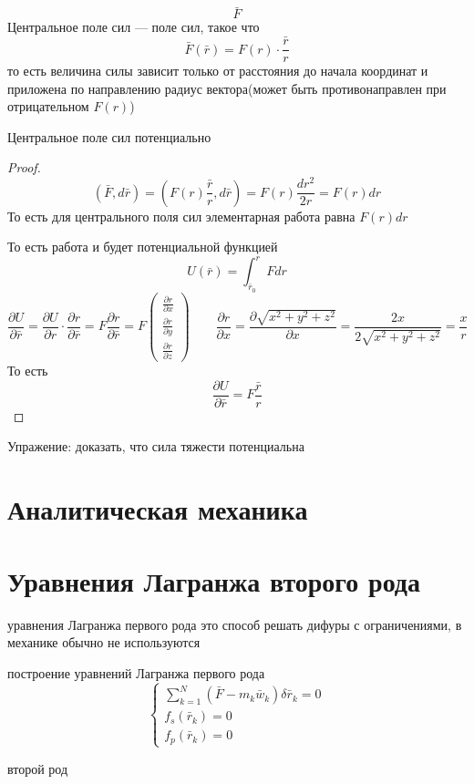 \documentclass[crop=false]{standalone}
\begin{document}
\[\bar F\]
\Def Центральное поле сил — поле сил, такое что
\[\bar F(\bar r) = F(r) \cdot \frac{\bar r}{r}\]
то есть величина силы зависит только от расстояния до начала координат и приложена по направлению радиус вектора(может быть противонаправлен при  отрицательном $F(r)$)

\noindent \keypoint Центральное поле сил потенциально
\begin{proof}
    \[(\bar F, d \bar r) = \left(F(r) \frac{\bar r}{r}, d \bar r\right) = F(r) \frac{d r^2}{2 r} = F(r) d r\]
    То есть для центрального поля сил элементарная работа равна $F(r) dr$
    
    То есть работа и будет потенциальной функцией
    \[U(\bar r) = \int_{\bar r_0}^r F d r\]
    \[\frac{\partial U}{\partial \bar r} = \frac{\partial U}{\partial r} \cdot \frac{\partial r}{\partial \bar r} = F \frac{\partial r}{\partial \bar r} = F \begin{pmatrix}
        \frac{\partial r}{\partial x} \\ \frac{\partial r}{\partial y} \\ \frac{\partial r}{\partial z}
    \end{pmatrix} \qquad \frac{\partial r}{\partial x} = \frac{\partial \sqrt{x^2 + y^2 + z^2}}{\partial x} = \frac{2 x}{2 \sqrt{x^2 + y^2 + z^2}} = \frac{x}{r}\]
    То есть
    \[\frac{\partial U}{\partial \bar r} = F \frac{\bar r}{r}\]
\end{proof}
Упражение: доказать, что сила тяжести потенциальна

\section*{Аналитическая механика} %
\section{Уравнения Лагранжа второго рода}
\keypoint уравнения Лагранжа первого рода это способ решать дифуры с ограничениями, в механике обычно не используются

построение уравнений Лагранжа первого рода
\[
\begin{cases}
\sum_{k=1}^N (\bar F - m_k \bar w_k) \delta \bar r_k =0 \\ f_s(\bar r_k) = 0\\ f_p(\bar r_k) = 0
\end{cases}
\]

\noindent \keypoint второй род
\end{document}
